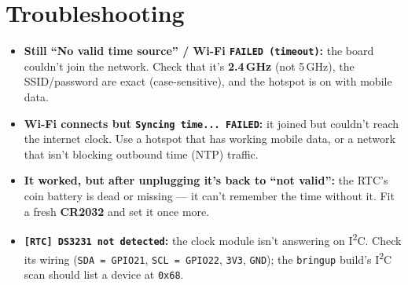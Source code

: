 \documentclass[11pt]{article}
\begin{document}
\section{Troubleshooting}
\begin{itemize}[leftmargin=1.6em]
  \item \textbf{Still ``No valid time source'' / Wi-Fi \texttt{FAILED (timeout)}:}
        the board couldn't join the network. Check that it's \textbf{2.4\,GHz} (not
        5\,GHz), the SSID/password are exact (case-sensitive), and the hotspot is on
        with mobile data.
  \item \textbf{Wi-Fi connects but \texttt{Syncing time... FAILED}:} it joined but
        couldn't reach the internet clock. Use a hotspot that has working mobile data,
        or a network that isn't blocking outbound time (NTP) traffic.
  \item \textbf{It worked, but after unplugging it's back to ``not valid'':} the RTC's
        coin battery is dead or missing --- it can't remember the time without it.
        Fit a fresh \textbf{CR2032} and set it once more.
  \item \textbf{\texttt{[RTC] DS3231 not detected}:} the clock module isn't answering
        on I\textsuperscript{2}C. Check its wiring (\texttt{SDA\,=\,GPIO21},
        \texttt{SCL\,=\,GPIO22}, \texttt{3V3}, \texttt{GND}); the \texttt{bringup}
        build's I\textsuperscript{2}C scan should list a device at \texttt{0x68}.
\end{itemize}
\end{document}

